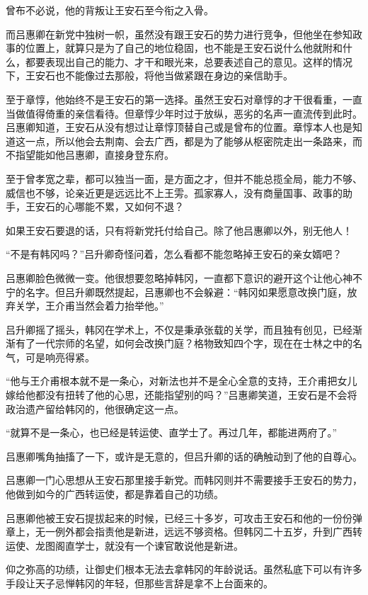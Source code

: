 曾布不必说，他的背叛让王安石至今衔之入骨。

而吕惠卿在新党中独树一帜，虽然没有跟王安石的势力进行竞争，但他坐在参知政事的位置上，就算只是为了自己的地位稳固，也不能是王安石说什么他就附和什么，都要表现出自己的能力、才干和眼光来，总要表述自己的意见。这样的情况下，王安石也不能像过去那般，将他当做紧跟在身边的亲信助手。

至于章惇，他始终不是王安石的第一选择。虽然王安石对章惇的才干很看重，一直当做值得倚重的亲信看待。但章惇少年时过于放纵，恶劣的名声一直流传到此时。吕惠卿知道，王安石从没有想过让章惇顶替自己或是曾布的位置。章惇本人也是知道这一点，所以他会去荆南、会去广西，都是为了能够从枢密院走出一条路来，而不指望能如他吕惠卿，直接身登东府。

至于曾孝宽之辈，都可以独当一面，是方面之才，但并不能总揽全局，能力不够、威信也不够，论亲近更是远远比不上王雱。孤家寡人，没有商量国事、政事的助手，王安石的心哪能不累，又如何不退？

如果王安石要退的话，只有将新党托付给自己。除了他吕惠卿以外，别无他人！

“不是有韩冈吗？”吕升卿奇怪问着，怎么看都不能忽略掉王安石的亲女婿吧？

吕惠卿脸色微微一变。他很想要忽略掉韩冈，一直都下意识的避开这个让他心神不宁的名字。但吕升卿既然提起，吕惠卿也不会躲避：“韩冈如果愿意改换门庭，放弃关学，王介甫当然会着力抬举他。”

吕升卿摇了摇头，韩冈在学术上，不仅是秉承张载的关学，而且独有创见，已经渐渐有了一代宗师的名望，如何会改换门庭？格物致知四个字，现在在士林之中的名气，可是响亮得紧。

“他与王介甫根本就不是一条心，对新法也并不是全心全意的支持，王介甫把女儿嫁给他都没有扭转了他的心思，还能指望别的吗？”吕惠卿笑道，王安石是不会将政治遗产留给韩冈的，他很确定这一点。

“就算不是一条心，也已经是转运使、直学士了。再过几年，都能进两府了。”

吕惠卿嘴角抽搐了一下，或许是无意的，但吕升卿的话的确触动到了他的自尊心。

吕惠卿一门心思想从王安石那里接手新党。而韩冈则并不需要接手王安石的势力，他做到如今的广西转运使，都是靠着自己的功绩。

吕惠卿他被王安石提拔起来的时候，已经三十多岁，可攻击王安石和他的一份份弹章上，无一例外都会指责他是新进，远远不够资格。但韩冈二十五岁，升到广西转运使、龙图阁直学士，就没有一个谏官敢说他是新进。

仰之弥高的功绩，让御史们根本无法去拿韩冈的年龄说话。虽然私底下可以有许多手段让天子忌惮韩冈的年轻，但那些言辞是拿不上台面来的。

